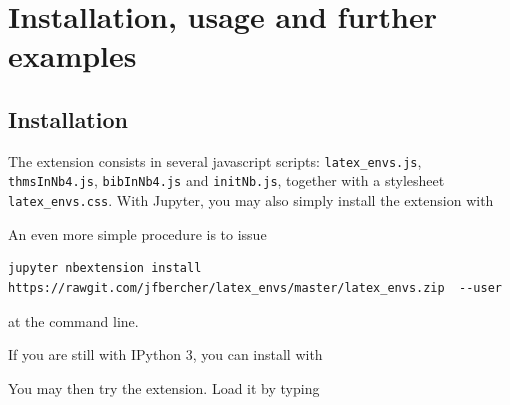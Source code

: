     \section{Installation, usage and further
examples}\label{installation-usage-and-further-examples}

    \subsection{Installation}\label{installation}

    The extension consists in several javascript scripts:
\texttt{latex\_envs.js}, \texttt{thmsInNb4.js}, \texttt{bibInNb4.js} and
\texttt{initNb.js}, together with a stylesheet \texttt{latex\_envs.css}.
With Jupyter, you may also simply install the extension with

\begin{Shaded}
\begin{Highlighting}[]
  
\NormalTok{)}
\end{Highlighting}
\end{Shaded}

    An even more simple procedure is to issue

\begin{verbatim}
jupyter nbextension install https://rawgit.com/jfbercher/latex_envs/master/latex_envs.zip  --user
\end{verbatim}

at the command line.

    If you are still with IPython 3, you can install with

\begin{Shaded}
\begin{Highlighting}[]
  
\NormalTok{)}
\end{Highlighting}
\end{Shaded}

    You may then try the extension. Load it by typing

\begin{Shaded}
\end{Shaded}

